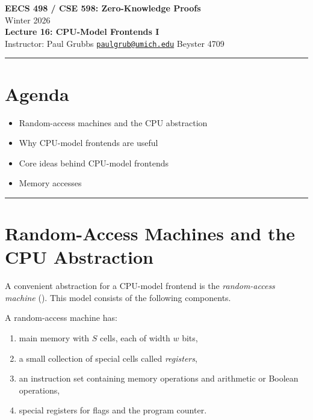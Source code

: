 \documentclass[11pt]{article}
\begin{document}
\begin{center}
  {\LARGE \textbf{EECS 498 / CSE 598: Zero-Knowledge Proofs}}\\[6pt]
  {\large Winter 2026}\\[4pt]
  {\large \textbf{Lecture 16: CPU-Model Frontends I}}\\[4pt]
  {\large Instructor: Paul Grubbs \quad
    \href{mailto:paulgrub@umich.edu}{\texttt{paulgrub@umich.edu}} \quad
    Beyster 4709}
\end{center}

\vspace{0.5em}
\hrule
\vspace{1em}

\section*{Agenda}
\begin{itemize}
  \item Random-access machines and the CPU abstraction
  \item Why CPU-model frontends are useful
  \item Core ideas behind CPU-model frontends
  \item Memory accesses
\end{itemize}

\hrule
\vspace{1em}

\section{Random-Access Machines and the CPU Abstraction}

A convenient abstraction for a CPU-model frontend is the \emph{random-access machine} (). This model consists of the following components.

\begin{definition}
A random-access machine has:
\begin{enumerate}
  \item main memory with $S$ cells, each of width $w$ bits,
  \item a small collection of special cells called \emph{registers},
  \item an instruction set containing memory operations and arithmetic or Boolean operations,
  \item special registers for flags and the program counter.
\end{enumerate}
\end{definition}
\end{document}
